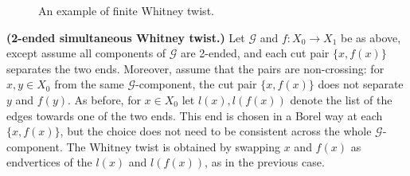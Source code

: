 \documentclass{article}
\theoremstyle{plain}
\theoremstyle{definition}
\newcommand{\cG}{\mathcal{G}}
\begin{document}
\begin{figure}[htb]
{%
}
\caption{An example of finite Whitney twist.\label{fig:finite_twist}}
\end{figure}

{\bf (2-ended simultaneous Whitney twist.)} Let $\cG$ and $f:X_0 \to X_1$ be as above, except assume all components of $\cG$ are 2-ended, and each cut pair $\{x,f(x)\}$ separates the two ends. Moreover, assume that the pairs are non-crossing: for $x,y \in X_0$ from the same $\cG$-component, the cut pair $\{x,f(x)\}$ does not separate $y$ and $f(y)$. As before, for $x \in X_0$ let $l(x), l(f(x))$ denote the list of the edges towards one of the two ends. This end is chosen in a Borel way at each $\{x,f(x)\}$, but the choice does not need to be consistent across the whole $\cG$-component. The Whitney twist is obtained by swapping $x$ and $f(x)$ as endvertices of the $l(x)$ and $l(f(x))$, as in the previous case.
\end{document}
